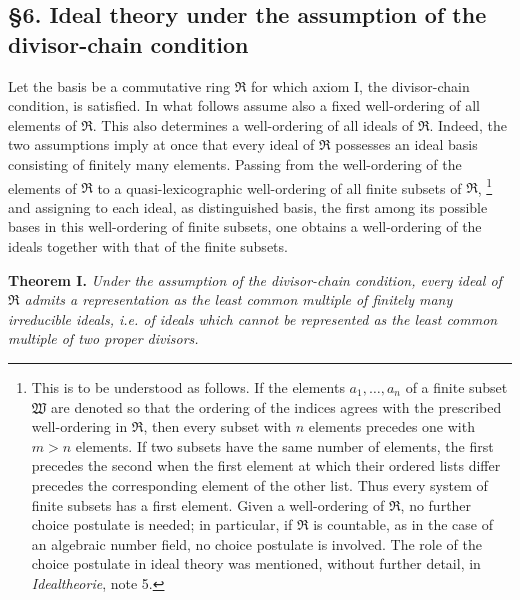\documentclass[11pt]{article}
\providecommand{\mR}{\mathfrak{R}}
\begin{document}
\setcounter{footnote}{25}

\subsection*{§6. Ideal theory under the assumption of the divisor-chain condition}

Let the basis be a commutative ring $\mR$ for which axiom I, the divisor-chain condition, is satisfied. In what follows assume also a fixed well-ordering of all elements of $\mR$. This also determines a well-ordering of all ideals of $\mR$. Indeed, the two assumptions imply at once that every ideal of $\mR$ possesses an ideal basis consisting of finitely many elements. Passing from the well-ordering of the elements of $\mR$ to a quasi-lexicographic well-ordering of all finite subsets of $\mR$,
\footnote{This is to be understood as follows. If the elements $a_1,\ldots,a_n$ of a finite subset $\mathfrak W$ are denoted so that the ordering of the indices agrees with the prescribed well-ordering in $\mR$, then every subset with $n$ elements precedes one with $m>n$ elements. If two subsets have the same number of elements, the first precedes the second when the first element at which their ordered lists differ precedes the corresponding element of the other list. Thus every system of finite subsets has a first element. Given a well-ordering of $\mR$, no further choice postulate is needed; in particular, if $\mR$ is countable, as in the case of an algebraic number field, no choice postulate is involved. The role of the choice postulate in ideal theory was mentioned, without further detail, in \emph{Idealtheorie}, note 5.}
and assigning to each ideal, as distinguished basis, the first among its possible bases in this well-ordering of finite subsets, one obtains a well-ordering of the ideals together with that of the finite subsets.

\textbf{Theorem I.} \emph{Under the assumption of the divisor-chain condition, every ideal of $\mR$ admits a representation as the least common multiple of finitely many irreducible ideals, i.e. of ideals which cannot be represented as the least common multiple of two proper divisors.}
\end{document}
